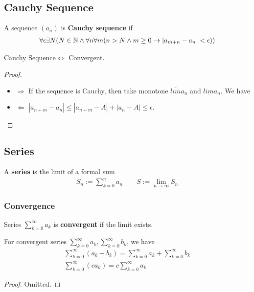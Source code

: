 \documentclass[Total.tex]{subfiles}
\begin{document}
			\subsection{Cauchy Sequence}
			\begin{Def}
				A sequence $(a_n)$ is \textbf{Cauchy sequence} if
				\begin{gather*}
					\forall\epsilon\exists N(N\in \mathbb{N}\wedge \forall n\forall m(n>N\wedge m\geq0\rightarrow |a_{m+n}-a_n|<\epsilon))
				\end{gather*}
			\end{Def}
			
			\begin{proposition}
				\begin{center}
					Cauchy Sequence$\Leftrightarrow$ Convergent.
				\end{center}
			\end{proposition}
			\begin{proof}
				\begin{itemize}
					\item $\Rightarrow$ If the sequence is Cauchy, then take monotone $\overline{lim} a_n$ and $\underline{lim} a_n$. We have 
					\item $\Leftarrow$ $|a_{n+m}-a_n|\leq |a_{n+m}-A|+|a_n-A|\leq \epsilon$. 
				\end{itemize}
			\end{proof}
			
	
		
			\subsection{Series}
				\begin{Def}
					A \textbf{series} is the limit of a formal sum
					\begin{gather*}
						S_n:=\sum_{k=0}^n a_n\qquad S:=\lim_{n\rightarrow \infty} S_{n}
					\end{gather*}
				\end{Def}
				
				\subsubsection{Convergence}
				
				\begin{Def}
					Series $\sum_{k=0}^\infty a_k$ is \textbf{convergent} if the limit exists. 
				\end{Def}
				
				\begin{proposition}
					For convergent series $\sum_{k=0}^\infty a_k,\sum_{k=0}^\infty b_k$, we have
					\begin{gather*}
						\sum_{k=0}^\infty (a_k+b_k)=\sum_{k=0}^\infty a_k+\sum_{k=0}^\infty b_k\\
						\sum_{k=0}^\infty (ca_k)=c\sum_{k=0}^\infty a_k
					\end{gather*}
				\end{proposition}
				\begin{proof}
					Omitted.
				\end{proof}
				
\end{document}

